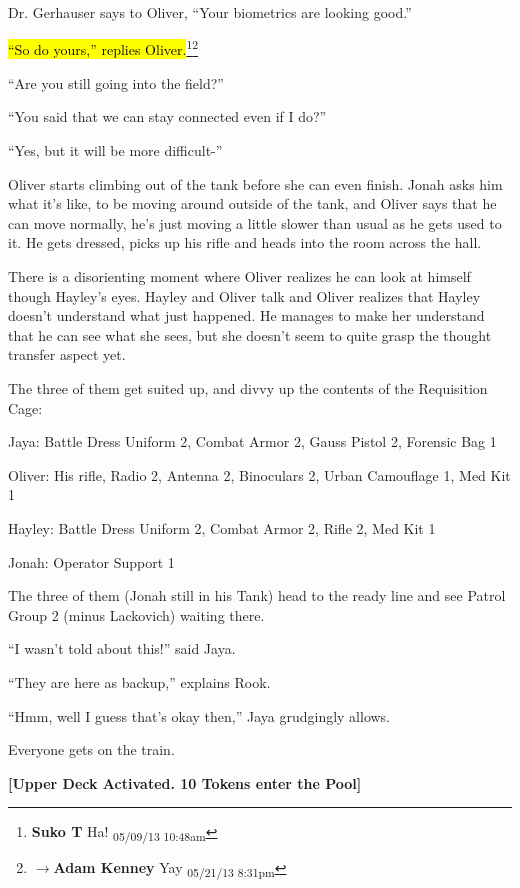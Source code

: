 Dr. Gerhauser says to Oliver, ``Your biometrics are looking good.''

\hl{``So do yours,'' replies Oliver.}\footnote{\textbf{Suko T }Ha! \textsubscript{05/09/13 10:48am}}\footnote{$\rightarrow$\textbf{Adam Kenney }Yay \textsubscript{05/21/13 8:31pm}}

``Are you still going into the field?''

``You said that we can stay connected even if I do?''

``Yes, but it will be more difficult-''

Oliver starts climbing out of the tank before she can even finish.  Jonah asks him what it's like, to be moving around outside of the tank, and Oliver says that he can move normally, he's just moving a little slower than usual as he gets used to it. He gets dressed, picks up his rifle and heads into the room across the hall.  



There is a disorienting moment where Oliver realizes he can look at himself though Hayley's eyes.  Hayley and Oliver talk and Oliver realizes that Hayley doesn't understand what just happened.  He manages to make her understand that he can see what she sees, but she doesn't seem to quite grasp the thought transfer aspect yet.



The three of them get suited up, and divvy up the contents of the Requisition Cage:

Jaya: Battle Dress Uniform 2, Combat Armor 2, Gauss Pistol 2, Forensic Bag 1

Oliver: His rifle, Radio 2, Antenna 2, Binoculars 2, Urban Camouflage 1, Med Kit 1 

Hayley: Battle Dress Uniform 2, Combat Armor 2, Rifle 2, Med Kit 1

Jonah: Operator Support 1



The three of them (Jonah still in his Tank) head to the ready line and see Patrol Group 2 (minus Lackovich) waiting there.

``I wasn't told about this!'' said Jaya.

``They are here as backup,'' explains Rook.

``Hmm, well I guess that's okay then,'' Jaya grudgingly allows.

Everyone gets on the train.



\textbf{{[}Upper Deck Activated.  10 Tokens enter the Pool{]}}



